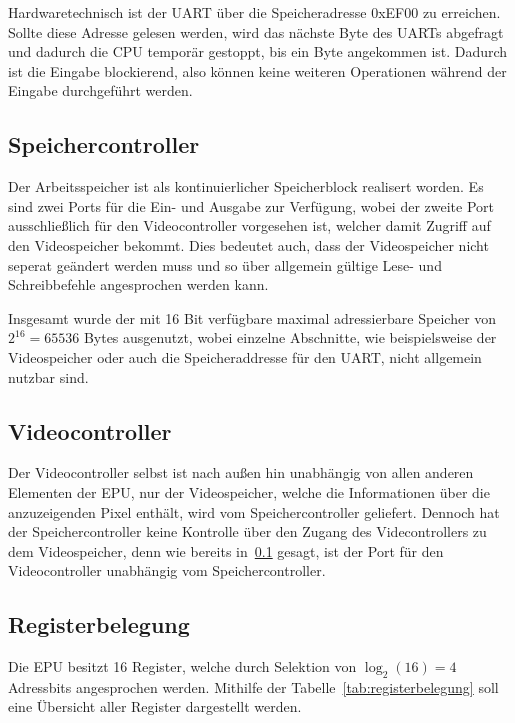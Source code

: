 Hardwaretechnisch ist der UART über die Speicheradresse 0xEF00 zu erreichen.
Sollte diese Adresse gelesen werden, wird das nächste Byte des UARTs abgefragt
und dadurch die CPU temporär gestoppt, bis ein Byte angekommen ist. Dadurch ist
die Eingabe blockierend, also können keine weiteren Operationen während der
Eingabe durchgeführt werden.
\subsection{Speichercontroller}
\label{s:memorycontrol}
Der Arbeitsspeicher ist als kontinuierlicher Speicherblock realisert worden. Es
sind zwei Ports für die Ein- und Ausgabe zur Verfügung, wobei der zweite Port
ausschließlich für den Videocontroller vorgesehen ist, welcher damit Zugriff auf
den Videospeicher bekommt. Dies bedeutet auch, dass der Videospeicher nicht
seperat geändert werden muss und so über allgemein gültige Lese- und
Schreibbefehle angesprochen werden kann.

Insgesamt wurde der mit 16 Bit verfügbare maximal adressierbare Speicher von
$2^{16} = 65536$ Bytes ausgenutzt, wobei einzelne Abschnitte, wie beispielsweise
der Videospeicher oder auch die Speicheraddresse für den UART, nicht allgemein nutzbar sind.
\subsection{Videocontroller}
\label{s:videocontrol}
Der Videocontroller selbst ist nach außen hin unabhängig von allen anderen
Elementen der \ac{EPU}, nur der Videospeicher, welche die Informationen über die
anzuzeigenden Pixel enthält, wird vom Speichercontroller geliefert. Dennoch hat
der Speichercontroller keine Kontrolle über den Zugang des Videcontrollers zu
dem Videospeicher, denn wie bereits in~\ref{s:memorycontrol} gesagt, ist der
Port für den Videocontroller unabhängig vom Speichercontroller.
\pagebreak
\subsection{Registerbelegung}
Die \ac{EPU} besitzt 16 Register, welche durch Selektion von $\log_2(16) = 4$
Adressbits angesprochen werden. Mithilfe der Tabelle~\ref{tab:registerbelegung}
soll eine Übersicht aller Register dargestellt werden.

